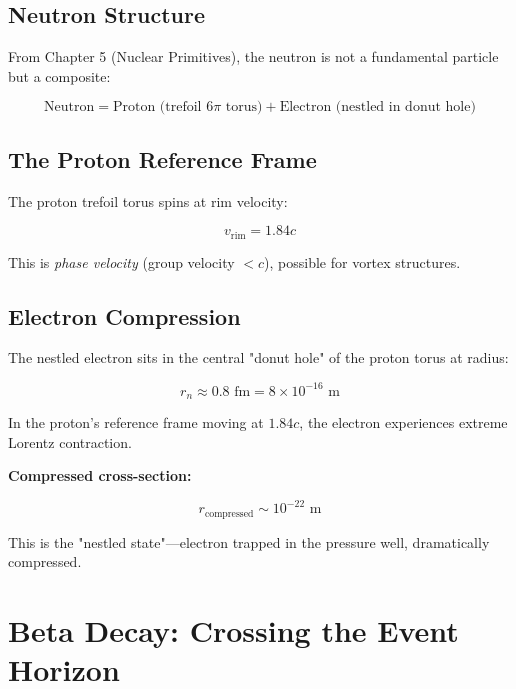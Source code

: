 \subsection{Neutron Structure}

From Chapter 5 (Nuclear Primitives), the neutron is not a fundamental particle but a composite:

\begin{equation}
\text{Neutron} = \text{Proton (trefoil 6}\pi\text{ torus)} + \text{Electron (nestled in donut hole)}
\end{equation}

\subsection{The Proton Reference Frame}

The proton trefoil torus spins at rim velocity:

\begin{equation}
v_{\text{rim}} = 1.84c
\label{eq:proton_rim}
\end{equation}

This is \emph{phase velocity} (group velocity $< c$), possible for vortex structures.

\subsection{Electron Compression}

The nestled electron sits in the central "donut hole" of the proton torus at radius:

\begin{equation}
r_n \approx 0.8 \text{ fm} = 8 \times 10^{-16} \text{ m}
\end{equation}

In the proton's reference frame moving at $1.84c$, the electron experiences extreme Lorentz contraction.

\textbf{Compressed cross-section:}

\begin{equation}
r_{\text{compressed}} \sim 10^{-22} \text{ m}
\end{equation}

This is the "nestled state"—electron trapped in the pressure well, dramatically compressed.

\section{Beta Decay: Crossing the Event Horizon}

